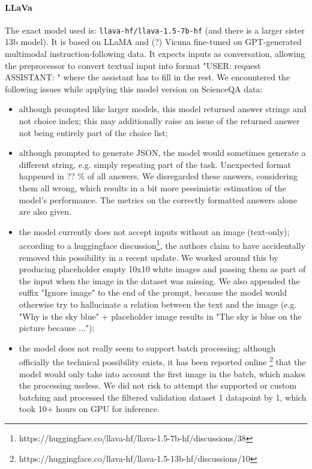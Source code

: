 \documentclass[10pt]{article}
\begin{document}
\paragraph{LLaVa} The exact model used is: \texttt{llava-hf/llava-1.5-7b-hf} (and there is a larger sister 13b model). It is based on LLaMA and (?) Vicuna fine-tuned on GPT-generated multimodal instruction-following data.
It expects inputs as conversation, allowing the preprocessor to convert textual input into format "USER: {request} ASSISTANT: " where the assistant has to fill in the rest. 
We encountered the following issues while applying this model version on ScienceQA data: 
\begin{itemize}
	\item although prompted like larger models, this model returned answer strings and not choice index; this may additionally raise an issue of the returned answer not being entirely part of the choice list;
	\item although prompted to generate JSON, the model would sometimes generate a different string, e.g. simply repeating part of the task. Unexpected format happened in ?? \% of all answers. We disregarded these answers, considering them all wrong, which results in a bit more pessimistic estimation of the model's performance. The metrics on the correctly formatted answers alone are also given. 
	\item the model currently does not accept inputs without an image (text-only); according to a huggingface discussion\footnote{https://huggingface.co/llava-hf/llava-1.5-7b-hf/discussions/38}, the authors claim to have accidentally removed this possibility in a recent update. We worked around this by producing placeholder empty 10x10 white images and passing them as part of the input when the image in the dataset was missing. We also appended the suffix "Ignore image" to the end of the prompt, because the model would otherwise try to hallucinate a relation between the text and the image (e.g. "Why is the sky blue" + placeholder image results in "The sky is blue on the picture because ...");
	\item the model does not really seem to support batch processing; although officially the technical possibility exists, it has been reported online \footnote{https://huggingface.co/llava-hf/llava-1.5-13b-hf/discussions/10} that the model would only take into account the first image in the batch, which makes the processing useless. We did not risk to attempt the supported or custom batching and processed the filtered validation dataset 1 datapoint by 1, which took 10+ hours on GPU for inference. 
\end{itemize}
\end{document}
